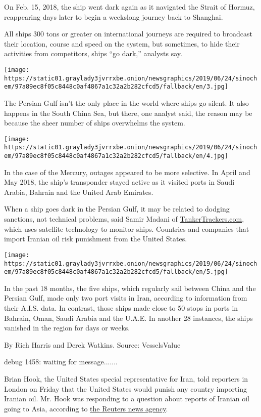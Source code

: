 On Feb. 15, 2018, the ship went dark again as it navigated the Strait of
Hormuz, reappearing days later to begin a weekslong journey back to
Shanghai.

All ships 300 tons or greater on international journeys are required to
broadcast their location, course and speed on the system, but sometimes,
to hide their activities from competitors, ships ``go dark,'' analysts
say.

\texttt{[image: https://static01.graylady3jvrrxbe.onion/newsgraphics/2019/06/24/sinochem/97a89ec8f05c8448c0af4867a1c32a2b282cfcd5/fallback/en/3.jpg]}

The Persian Gulf isn't the only place in the world where ships go
silent. It also happens in the South China Sea, but there, one analyst
said, the reason may be because the sheer number of ships overwhelms the
system.

\texttt{[image: https://static01.graylady3jvrrxbe.onion/newsgraphics/2019/06/24/sinochem/97a89ec8f05c8448c0af4867a1c32a2b282cfcd5/fallback/en/4.jpg]}

In the case of the Mercury, outages appeared to be more selective. In
April and May 2018, the ship's transponder stayed active as it visited
ports in Saudi Arabia, Bahrain and the United Arab Emirates.

When a ship goes dark in the Persian Gulf, it may be related to dodging
sanctions, not technical problems, said Samir Madani of
\href{https://tankertrackers.com/}{TankerTrackers.com}, which uses
satellite technology to monitor ships. Countries and companies that
import Iranian oil risk punishment from the United States.

\texttt{[image: https://static01.graylady3jvrrxbe.onion/newsgraphics/2019/06/24/sinochem/97a89ec8f05c8448c0af4867a1c32a2b282cfcd5/fallback/en/5.jpg]}

In the past 18 months, the five ships, which regularly sail between
China and the Persian Gulf, made only two port visits in Iran, according
to information from their A.I.S. data. In contrast, those ships made
close to 50 stops in ports in Bahrain, Oman, Saudi Arabia and the U.A.E.
In another 28 instances, the ships vanished in the region for days or
weeks.

By Rich Harris and Derek Watkins. Source: VesselsValue

debug 1458: waiting for message.......

Brian Hook, the United States special representative for Iran, told
reporters in London on Friday that the United States would punish any
country importing Iranian oil. Mr. Hook was responding to a question
about reports of Iranian oil going to Asia, according to
\href{https://www.reuters.com/article/us-mideast-iran-usa-diplomat-idUSKCN1TT1IW}{the
Reuters news agency}.

